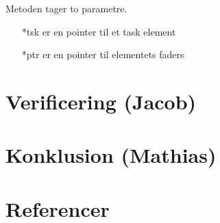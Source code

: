 \documentclass[danish]{report}
\begin{document}
Metoden tager to parametre.

\begin{itemize}
	\item[*tsk] er en pointer til et task element
	\item[*ptr] er en pointer til elementets faders 
\end{itemize}

\chapter{Verificering (Jacob)}
\chapter{Konklusion (Mathias)}
\chapter{Referencer}
\end{document}
